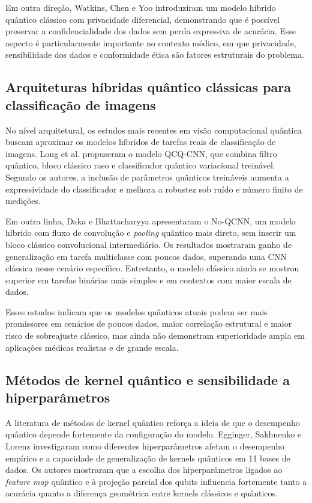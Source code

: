 \documentclass[
    12pt,
    openright,
    oneside,
    a4paper,
    english,
    brazil
]{abntex2}
\begin{document}
Em outra direção, Watkins, Chen e Yoo \cite{watkins2023} introduziram um modelo híbrido quântico clássico com privacidade diferencial, demonstrando que é possível preservar a confidencialidade dos dados sem perda expressiva de acurácia. Esse aspecto é particularmente importante no contexto médico, em que privacidade, sensibilidade dos dados e conformidade ética são fatores estruturais do problema.

\subsection{Arquiteturas híbridas quântico clássicas para classificação de imagens}

No nível arquitetural, os estudos mais recentes em visão computacional quântica buscam aproximar os modelos híbridos de tarefas reais de classificação de imagens. Long et al. \cite{long2025} propuseram o modelo QCQ-CNN, que combina filtro quântico, bloco clássico raso e classificador quântico variacional treinável. Segundo os autores, a inclusão de parâmetros quânticos treináveis aumenta a expressividade do classificador e melhora a robustez sob ruído e número finito de medições.

Em outra linha, Daka e Bhattacharyya \cite{daka2026} apresentaram o No-QCNN, um modelo híbrido com fluxo de convolução e \textit{pooling} quântico mais direto, sem inserir um bloco clássico convolucional intermediário. Os resultados mostraram ganho de generalização em tarefa multiclasse com poucos dados, superando uma CNN clássica nesse cenário específico. Entretanto, o modelo clássico ainda se mostrou superior em tarefas binárias mais simples e em contextos com maior escala de dados.

Esses estudos indicam que os modelos quânticos atuais podem ser mais promissores em cenários de poucos dados, maior correlação estrutural e maior risco de sobreajuste clássico, mas ainda não demonstram superioridade ampla em aplicações médicas realistas e de grande escala.

\subsection{Métodos de kernel quântico e sensibilidade a hiperparâmetros}

A literatura de métodos de kernel quântico reforça a ideia de que o desempenho quântico depende fortemente da configuração do modelo. Egginger, Sakhnenko e Lorenz \cite{egginger2024} investigaram como diferentes hiperparâmetros afetam o desempenho empírico e a capacidade de generalização de kernels quânticos em 11 bases de dados. Os autores mostraram que a escolha dos hiperparâmetros ligados ao \textit{feature map} quântico e à projeção parcial dos qubits influencia fortemente tanto a acurácia quanto a diferença geométrica entre kernels clássicos e quânticos.
\end{document}
